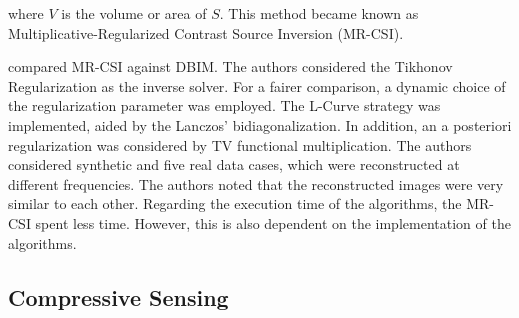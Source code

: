 			\noindent where $V$ is the volume or area of $S$. This method became known as Multiplicative-Regularized Contrast Source Inversion (MR-CSI).
			
			\cite{gilmore2009comparison} compared MR-CSI against DBIM. The authors considered the Tikhonov Regularization as the inverse solver. For a fairer comparison, a dynamic choice of the regularization parameter was employed. The L-Curve strategy was implemented, aided by the Lanczos' bidiagonalization. In addition, an a posteriori regularization was considered by TV functional multiplication. The authors considered synthetic and five real data cases, which were reconstructed at different frequencies. The authors noted that the reconstructed images were very similar to each other. Regarding the execution time of the algorithms, the MR-CSI spent less time. However, this is also dependent on the implementation of the algorithms.
			
		\subsection{Compressive Sensing}\label{chap:methods:deterministic:cs}

